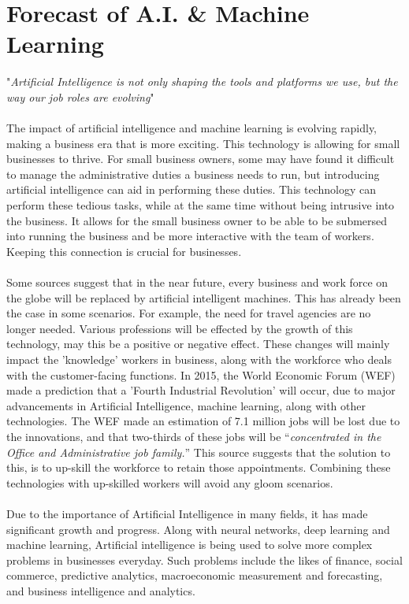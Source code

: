 \documentclass{article}
\begin{document}
\section{Forecast of A.I. \& Machine Learning}
"\textit{Artificial Intelligence is not only shaping the tools and platforms we use, but the way our job roles are evolving}"\cite{13039418620180629}\\\\
The impact of artificial intelligence and machine learning is evolving rapidly, making a business era that is more exciting. This technology is allowing for small businesses to thrive. For small business owners, some may have found it difficult to manage the administrative duties a business needs to run, but introducing artificial intelligence can aid in performing these duties. This technology can perform these tedious tasks, while at the same time without being intrusive into the business. It allows for the small business owner to be able to be submersed into running the business and be more interactive with the team of workers. Keeping this connection is crucial for businesses.\cite{13039418620180629}
\\\\
Some sources suggest that in the near future, every business and work force on the globe will be replaced by artificial intelligent machines.\cite{146079120160101} This has already been the case in some scenarios. For example, the need for travel agencies are no longer needed. Various professions will be effected by the growth of this technology, may this be a positive or negative effect. These changes will mainly impact the 'knowledge' workers in business, along with the workforce who deals with the customer-facing functions. In 2015, the World Economic Forum (WEF) made a prediction that a 'Fourth Industrial Revolution' will occur, due to major advancements in Artificial Intelligence, machine learning, along with other technologies.\cite{146079120160101} The WEF made an estimation of 7.1 million jobs will be lost due to the innovations, and that two-thirds of these jobs will be “\textit{concentrated in the Office and Administrative job family.}” This source suggests that the solution to this, is to up-skill the workforce to retain those appointments. Combining these technologies with up-skilled workers will avoid any gloom scenarios.
\\\\
Due to the importance of Artificial Intelligence in many fields, it has made significant growth and progress. Along with neural networks, deep learning and machine learning, Artificial intelligence is being used to solve more complex problems in businesses everyday. Such problems include the likes of finance, social commerce, predictive analytics, macroeconomic measurement and forecasting, and business intelligence and analytics.\cite{S092523121731573420180131} 
\end{document}
